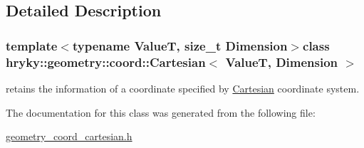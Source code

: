 \subsection{Detailed Description}
\subsubsection*{template$<$typename Value\-T, size\-\_\-t Dimension$>$class hryky\-::geometry\-::coord\-::\-Cartesian$<$ Value\-T, Dimension $>$}

retains the information of a coordinate specified by \hyperlink{classhryky_1_1geometry_1_1coord_1_1_cartesian}{Cartesian} coordinate system. 

The documentation for this class was generated from the following file\-:\begin{DoxyCompactItemize}
\item 
\hyperlink{geometry__coord__cartesian_8h}{geometry\-\_\-coord\-\_\-cartesian.\-h}\end{DoxyCompactItemize}
